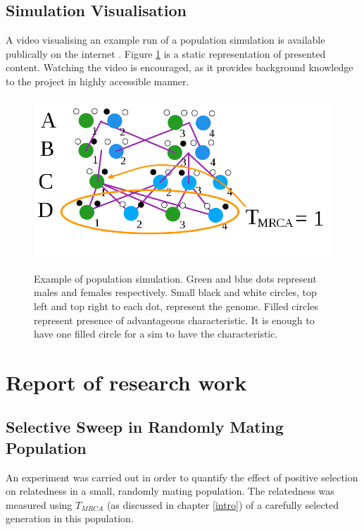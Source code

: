 \documentclass{l4proj}
\begin{document}
\section{Simulation Visualisation}

A video visualising an example run of a population simulation is available publically on the internet \parencite{Video16}. Figure \ref{videoScreenshot} is a static representation of presented content. Watching the video is encouraged, as it provides background knowledge to the project in highly accessible manner.

\begin{figure}
\centering
\includegraphics[scale=0.5]{videoScreenshot.png}
\label{videoScreenshot}
\caption{Example of population simulation. Green and blue dots represent males and females respectively. Small black and white circles, top left and top right to each dot, represent the genome. Filled circles represent presence of advantageous characteristic. It is enough to have one filled circle for a sim to have the characteristic.}
\end{figure}


\chapter{Report of research work}\label{research}

\section{Selective Sweep in Randomly Mating Population}

An experiment was carried out in order to quantify the effect of positive selection on relatedness in a small, randomly mating population. The relatedness was measured using $T_{MRCA}$ (as discussed in chapter \ref{intro}) of a carefully selected generation in this population.
\end{document}
